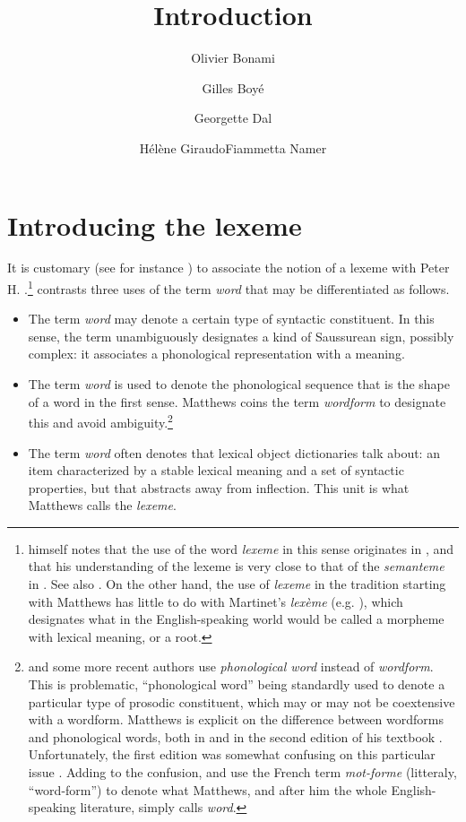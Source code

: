 \documentclass[output=paper]{langsci/langscibook}
\author{Olivier Bonami\affiliation{Université Paris Diderot}\and Gilles Boyé\affiliation{Université Bordeaux-Montaigne}\and Georgette Dal\affiliation{Université de Lille}\and Hélène Giraudo\affiliation{CLLE, Université de Toulouse, CNRS, Toulouse}\lastand Fiammetta Namer\affiliation{Université de Lorraine}}
\title{Introduction}
\begin{document}
 \section{Introducing the lexeme}


It is customary (see for instance \citealt[4]{Aronoff94}) to associate the
notion of a lexeme with Peter H. \citet{Matthews65,Matthews72,Matthews74,Matthews91}.\footnote{\citet[160]{Matthews72} himself notes that the use of
  the word \emph{lexeme} in this sense originates in \citet{Lyons63}, and
  that his understanding of the lexeme is very close to that of the
  \emph{semanteme} in \citet[287]{bally}. See also \citet[28]{Trnka49}. On
  the other hand, the use of \emph{lexeme} in the tradition starting
  with Matthews has little to do with Martinet's \emph{lexème} (e.g.
  \citealt{Martinet60}), which designates what in the English-speaking world
  would be called a morpheme with lexical meaning, or a root.} \citet[160-161]{Matthews72}
 contrasts three uses of the term \emph{word} that may be
differentiated as follows. 

\begin{itemize}
\item
  The term \emph{word} may denote a certain type of syntactic constituent. In this sense, the
  term unambiguously designates a kind of Saussurean sign, possibly
  complex: it associates a phonological representation with a meaning.
  \newpage 
\item
  The term \emph{word} is used to denote the phonological sequence that is the shape of a word in
  the first sense. Matthews coins the term \emph{wordform} to designate
  this and avoid ambiguity.\footnote{\citet{Lyons68} and some more recent
    authors use \emph{phonological word} instead of \emph{wordform}.
    This is problematic, ``phonological word'' being standardly used to
    denote a particular type of prosodic constituent, which may or may
    not be coextensive with a wordform. Matthews is explicit on the
    difference between wordforms and phonological words, both in
    \citet[2, 96, 161]{Matthews72} and in the second edition of his
    textbook \citep[42, 216]{Matthews91}. Unfortunately, the first edition
    was somewhat confusing on this particular issue \citep[32-33, 35]{Matthews74}. Adding to the confusion, \citet{melcuk93} and
    \citet{Fradin03} use the French term \emph{mot-forme} (litteraly,
    ``word-form'') to denote what Matthews, and after him the whole
    English-speaking literature, simply calls  \emph{word}.}
\item
  The term \emph{word} often denotes that lexical object dictionaries talk about: an item
  characterized by a stable lexical meaning and a set of syntactic
  properties, but that abstracts away from inflection. This unit is what
  Matthews calls the \emph{lexeme}.
\end{itemize}
\end{document}
